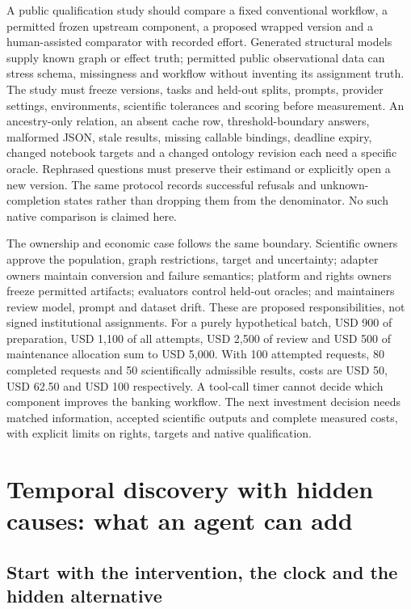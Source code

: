 A public qualification study should compare a fixed conventional workflow,
a permitted frozen upstream component, a proposed wrapped version and a
human-assisted comparator with recorded effort. Generated structural models
supply known graph or effect truth; permitted public observational data can
stress schema, missingness and workflow without inventing its assignment
truth. The study must freeze versions, tasks and held-out splits, prompts,
provider settings, environments, scientific tolerances and scoring before
measurement. An ancestry-only relation, an absent cache row, threshold-boundary
answers, malformed JSON, stale results, missing callable bindings, deadline
expiry, changed notebook targets and a changed ontology revision each need a
specific oracle. Rephrased questions must preserve their estimand or explicitly
open a new version. The same protocol records successful refusals and
unknown-completion states rather than dropping them from the denominator.
No such native comparison is claimed here.~\citep{exec25_agents_choice}

The ownership and economic case follows the same boundary. Scientific owners
approve the population, graph restrictions, target and uncertainty; adapter
owners maintain conversion and failure semantics; platform and rights owners
freeze permitted artifacts; evaluators control held-out oracles; and maintainers
review model, prompt and dataset drift. These are proposed responsibilities,
not signed institutional assignments. For a purely hypothetical batch, USD 900
of preparation, USD 1,100 of all attempts, USD 2,500 of review and USD 500 of
maintenance allocation sum to USD 5,000. With 100 attempted requests, 80
completed requests and 50 scientifically admissible results, costs are USD 50,
USD 62.50 and USD 100 respectively. A tool-call timer cannot decide which
component improves the banking workflow. The next investment decision needs
matched information, accepted scientific outputs and complete measured costs,
with explicit limits on rights, targets and native qualification.~\citep{exec25_agents_choice}


\section{Temporal discovery with hidden causes: what an agent can add}
\label{exec15:latent-temporal}

\subsection{Start with the intervention, the clock and the hidden alternative}

